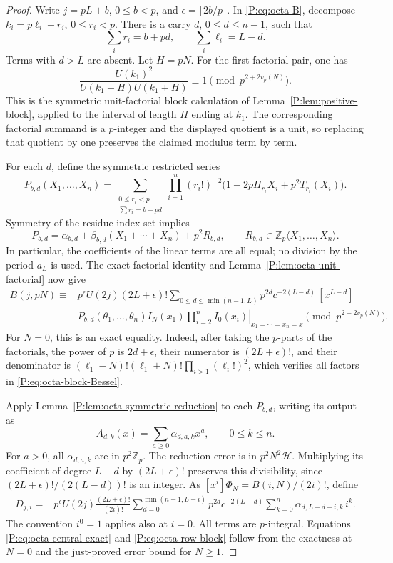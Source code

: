 \documentclass[11pt,a4paper]{article}
\theoremstyle{definition}\newtheorem{definition}[theorem]{Definition}
\theoremstyle{remark}\newtheorem{remark}[theorem]{Remark}
\numberwithin{equation}{section}
\begin{document}
\begin{proof}
Write \(j=pL+b\), \(0\leq b<p\), and
\(\epsilon=\lfloor2b/p\rfloor\).
In \eqref{P:eq:octa-B}, decompose
\(k_i=p\ell_i+r_i\), \(0\leq r_i<p\).
There is a carry \(d\), \(0\leq d\leq n-1\), such that
\[
 \sum_i r_i=b+pd,\qquad \sum_i\ell_i=L-d.
\]
Terms with \(d>L\) are absent.  Let \(H=pN\).
For the first factorial pair, one has
\[
 \frac{U(k_1)^2}{U(k_1-H)U(k_1+H)}
 \equiv1\pmod{p^{2+2v_p(N)}}.
\]
This is the symmetric unit-factorial block calculation of
Lemma~\ref{P:lem:positive-block}, applied to the interval of
length \(H\) ending at \(k_1\).
The corresponding factorial summand is a \(p\)-integer and
the displayed quotient is a unit, so replacing that quotient
by one preserves the claimed modulus term by term.

For each \(d\), define the symmetric restricted series
\[
 P_{b,d}(X_1,\ldots,X_n)
 =\sum_{\substack{0\leq r_i<p\\\sum r_i=b+pd}}
       \prod_{i=1}^n
       (r_i!)^{-2}
       \bigl(1-2pH_{r_i}X_i+p^2T_{r_i}(X_i)\bigr).
\]
Symmetry of the residue-index set implies
\[
 P_{b,d}=\alpha_{b,d}
       +\beta_{b,d}(X_1+\cdots+X_n)+p^2R_{b,d},
 \qquad R_{b,d}\in\mathbb Z_p\langle X_1,\ldots,X_n\rangle.
\]
In particular, the coefficients of the linear terms are all equal;
no division by the period \(a_L\) is used.
The exact factorial identity and
Lemma~\ref{P:lem:octa-unit-factorial} now give
\begin{align}\label{P:eq:octa-block-Bessel}
 B(j,pN)\equiv{}
 &p^\epsilon U(2j)(2L+\epsilon)!
 \sum_{0\leq d\leq\min(n-1,L)}
 p^{2d}c^{-2(L-d)}\,[x^{L-d}]
 \nonumber\\[-2pt]
 &\left.
 P_{b,d}(\theta_1,\ldots,\theta_n)
 I_N(x_1)\prod_{i=2}^n I_0(x_i)
 \right|_{x_1=\cdots=x_n=x}
 \pmod{p^{2+2v_p(N)}}.
\end{align}
For \(N=0\), this is an exact equality.
Indeed, after taking the \(p\)-parts of the factorials, the
power of \(p\) is \(2d+\epsilon\), their numerator is
\((2L+\epsilon)!\), and their denominator is
\((\ell_1-N)!(\ell_1+N)!\prod_{i>1}(\ell_i!)^2\),
which verifies all factors in \eqref{P:eq:octa-block-Bessel}.

Apply Lemma~\ref{P:lem:octa-symmetric-reduction} to each
\(P_{b,d}\), writing its output as
\[
 A_{d,k}(x)=\sum_{a\geq0}\alpha_{d,a,k}x^a,
 \qquad 0\leq k\leq n.
\]
For \(a>0\), all \(\alpha_{d,a,k}\) are in
\(p^2\mathbb Z_p\).  The reduction error is in
\(p^2N^2\mathcal H\).  Multiplying its coefficient of
degree \(L-d\) by \((2L+\epsilon)!\) preserves this
divisibility, since
\((2L+\epsilon)!/(2(L-d))!\) is an integer.
As \([x^i]\Phi_N=B(i,N)/(2i)!\), define
\begin{align}\label{P:eq:octa-D-definition}
 D_{j,i}={}&
 p^\epsilon U(2j)\frac{(2L+\epsilon)!}{(2i)!}
 \sum_{d=0}^{\min(n-1,L-i)}
 p^{2d}c^{-2(L-d)}
 \sum_{k=0}^{n}\alpha_{d,L-d-i,k}\,i^k.
\end{align}
The convention \(i^0=1\) applies also at \(i=0\).
All terms are \(p\)-integral.  Equations
\eqref{P:eq:octa-central-exact} and \eqref{P:eq:octa-row-block}
follow from the exactness at \(N=0\) and the just-proved
error bound for \(N\geq1\).


\end{proof}
\end{document}
